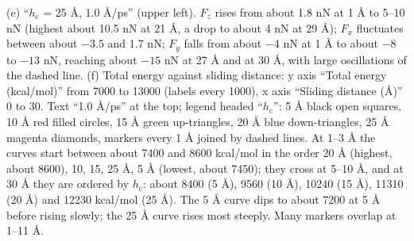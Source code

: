 \documentclass{article}
\begin{document}
{(e) ``$h_\mathrm{c}$ = 25 Å, 1.0 Å/ps'' (upper left). $F_z$ rises from about 1.8 nN at 1 Å to 5--10 nN (highest about 10.5 nN at 21 Å, a drop to about 4 nN at 29 Å); $F_x$ fluctuates between about $-3.5$ and 1.7 nN; $F_y$ falls from about $-4$ nN at 1 Å to about $-8$ to $-13$ nN, reaching about $-15$ nN at 27 Å and at 30 Å, with large oscillations of the dashed line.
(f) Total energy against sliding distance: y axis ``Total energy (kcal/mol)'' from 7000 to 13000 (labels every 1000), x axis ``Sliding distance (Å)'' 0 to 30. Text ``1.0 Å/ps'' at the top; legend headed ``$h_\mathrm{c}$'': 5 Å black open squares, 10 Å red filled circles, 15 Å green up-triangles, 20 Å blue down-triangles, 25 Å magenta diamonds, markers every 1 Å joined by dashed lines. At 1--3 Å the curves start between about 7400 and 8600 kcal/mol in the order 20 Å (highest, about 8600), 10, 15, 25 Å, 5 Å (lowest, about 7450); they cross at 5--10 Å, and at 30 Å they are ordered by $h_\mathrm{c}$: about 8400 (5 Å), 9560 (10 Å), 10240 (15 Å), 11310 (20 Å) and 12230 kcal/mol (25 Å). The 5 Å curve dips to about 7200 at 5 Å before rising slowly; the 25 Å curve rises most steeply. Many markers overlap at 1--11 Å.}
\end{document}
